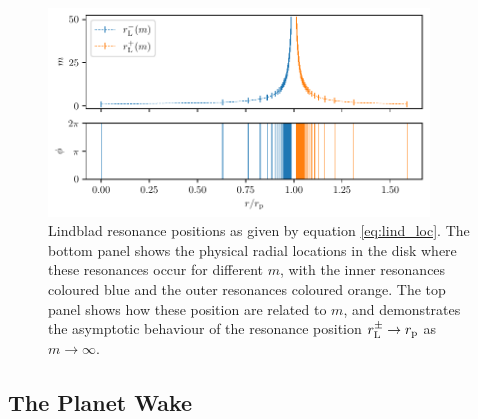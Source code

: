 \begin{figure}
    \centering
    \includegraphics[width = 0.9\textwidth]{figures/lindblad_two_panel.pdf}
    \caption{Lindblad resonance positions as given by equation \ref{eq:lind_loc}. The bottom panel shows the physical radial locations in the disk where these resonances occur for different $m$, with the inner resonances coloured blue and the outer resonances coloured orange. The top panel shows how these position are related to $m$, and demonstrates the asymptotic behaviour of the resonance position $r_{\rm L}^\pm \rightarrow r_{\rm p}$ as $m \rightarrow \infty$.}
    \label{fig:lindblad}
\end{figure}

\subsection{The Planet Wake} \label{sec:planetwake}

